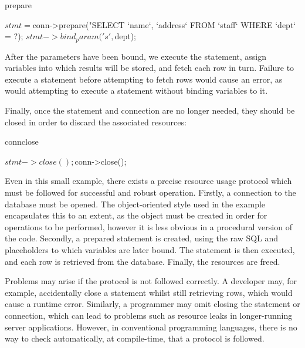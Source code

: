 \begin{SaveVerbatim}{prepare}

  $stmt = $conn->prepare("SELECT `name`, `address` 
     FROM `staff` WHERE `dept` = ?);
  $stmt->bind_param('s', $dept);

\end{SaveVerbatim}

\noindent
After the parameters have been bound, we execute the statement, assign
variables into which results will be stored, and fetch each row in turn. 
Failure to execute a statement before attempting to fetch rows would cause an error, as would attempting to execute a statement without binding variables to it.


\noindent
Finally, once the statement and connection are no longer needed, they should be
closed in order to discard the associated resources:

\begin{SaveVerbatim}{connclose}

  $stmt->close();
  $conn->close();

\end{SaveVerbatim}

\noindent
Even in this small example, there exists a precise resource usage protocol
which must be followed for successful and robust operation.
Firstly, a connection to the database must be opened. The object-oriented style
used in the example encapsulates this to an extent, as the object must be
created in order for operations to be performed, however it is less obvious in
a procedural version of the code. Secondly, a prepared statement is created,
using the raw SQL and placeholders to which variables are later bound. The
statement is then executed, and each row is retrieved from the database.
Finally, the resources are freed. 

Problems may arise if the protocol is not followed correctly.
A developer may, for example, accidentally close a statement whilst still
retrieving rows, which would cause a runtime error. Similarly, a programmer may
omit closing the statement or connection, which can lead to
problems such as resource leaks in longer-running server applications.
However, in conventional programming languages, there is no way to check
automatically, at compile-time, that a protocol is followed.

